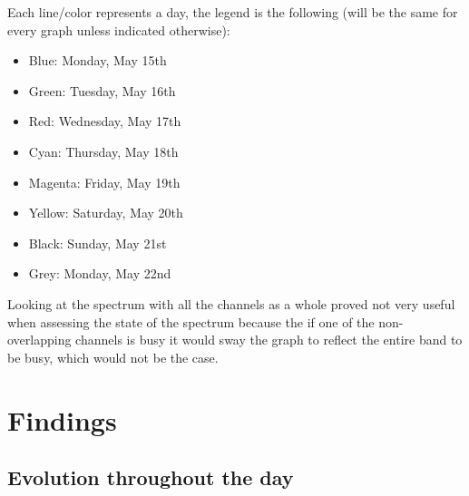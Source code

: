 \documentclass[a4paper, 11pt]{article}
\begin{document}
\clearpage
Each line/color represents a day, the legend is the following (will be the same for every graph unless indicated otherwise):
\begin{itemize}
\setlength\itemsep{-0.4em}
\item Blue: Monday, May 15th	
\item Green: Tuesday, May 16th
\item Red: Wednesday, May 17th
\item Cyan: Thursday, May 18th
\item Magenta: Friday, May 19th
\item Yellow: Saturday, May 20th
\item Black: Sunday, May 21st
\item Grey: Monday, May 22nd
\end{itemize}
Looking at the spectrum with all the channels as a whole proved not very useful when assessing the state of the spectrum because the if one of the non-overlapping channels is busy it would sway the graph to reflect the entire band to be busy, which would not be the case.
\section{Findings}
\subsection{Evolution throughout the day}
\end{document}
